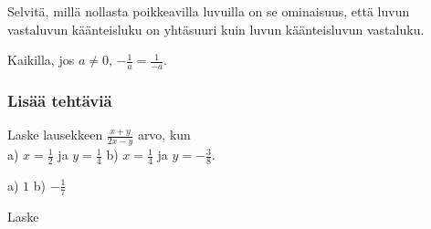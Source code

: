\begin{tehtavasivu}
\begin{tehtava}
Selvitä, millä nollasta poikkeavilla luvuilla on se ominaisuus, että luvun vastaluvun käänteisluku on yhtäsuuri kuin luvun käänteisluvun vastaluku.
\begin{vastaus}
Kaikilla, jos $a \neq 0$, $-\frac{1}{a} = \frac{1}{-a}$.
\end{vastaus}
\end{tehtava}

\subsubsection*{Lisää tehtäviä}

\begin{tehtava}
Laske lausekkeen $\frac{x+y}{2x-y}$ arvo, kun \\ a) $x=\frac{1}{2}$ ja $y= \frac{1}{4}$ \qquad b) $x=\frac{1}{4}$ ja $y= -\frac{3}{8}$.
\begin{vastaus}
a) $1$ \qquad b) $-\frac{1}{7}$
\end{vastaus}
\end{tehtava}
 
        \begin{tehtava} Laske %
            \begin{vastaus}
            \end{vastaus}
        \end{tehtava}
        
        \begin{tehtava}
            \begin{vastaus}		
            \end{vastaus}
        \end{tehtava}
        
        \begin{tehtava}
            \begin{vastaus}
            \end{vastaus}
        \end{tehtava}
        

\end{tehtavasivu}
